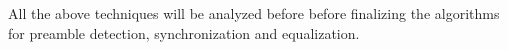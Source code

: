 All the above techniques will be analyzed before before finalizing the algorithms for preamble detection, synchronization and equalization.
%	
%
%
%

